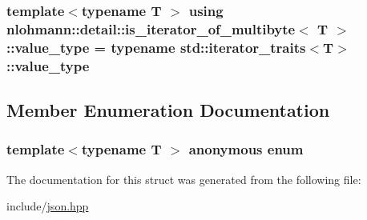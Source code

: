 \subsubsection[{\texorpdfstring{value\+\_\+type}{value_type}}]{\setlength{\rightskip}{0pt plus 5cm}template$<$typename T $>$ using {\bf nlohmann\+::detail\+::is\+\_\+iterator\+\_\+of\+\_\+multibyte}$<$ T $>$\+::{\bf value\+\_\+type} =  typename std\+::iterator\+\_\+traits$<$T$>$\+::{\bf value\+\_\+type}}\hypertarget{structnlohmann_1_1detail_1_1is__iterator__of__multibyte_a830339a3ad86d82d32a67f9c180523b1}{}\label{structnlohmann_1_1detail_1_1is__iterator__of__multibyte_a830339a3ad86d82d32a67f9c180523b1}


\subsection{Member Enumeration Documentation}
\subsubsection[{\texorpdfstring{anonymous enum}{anonymous enum}}]{\setlength{\rightskip}{0pt plus 5cm}template$<$typename T $>$ anonymous enum}\hypertarget{structnlohmann_1_1detail_1_1is__iterator__of__multibyte_afe3db603b87e21955942d1eaf6c59aec}{}\label{structnlohmann_1_1detail_1_1is__iterator__of__multibyte_afe3db603b87e21955942d1eaf6c59aec}


The documentation for this struct was generated from the following file\+:\begin{DoxyCompactItemize}
\item 
include/\hyperlink{json_8hpp}{json.\+hpp}\end{DoxyCompactItemize}
